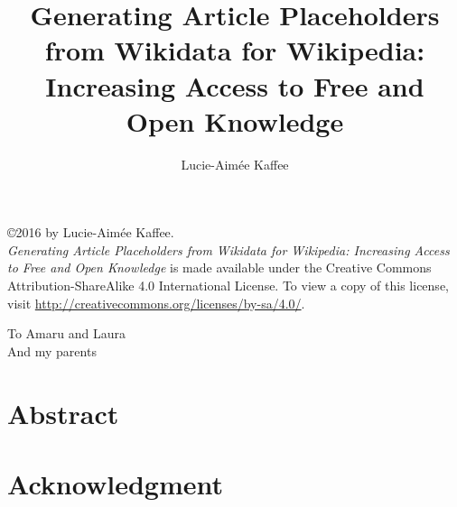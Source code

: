 \documentclass[11pt]{report} %
\title{Generating Article Placeholders from Wikidata for Wikipedia:\\Increasing Access to Free and Open Knowledge}
\author{Lucie-Aim\'{e}e Kaffee}
\date{}
\newenvironment{dedication}
  {\clearpage           %
   \thispagestyle{empty}%
   \vspace*{\stretch{1}}%
   \itshape             %
   \raggedleft          %
  }
  {\par %
   \vspace{\stretch{3}} %
   \clearpage           %
  }
\def\secondpage{\clearpage\null\vfill
\pagestyle{empty}
\begin{minipage}[b]{0.9\textwidth}
\footnotesize\raggedright
\setlength{\parskip}{0.5\baselineskip}
\copyright 2016 by Lucie-Aim\'{e}e Kaffee. \\
\textit{Generating Article Placeholders from Wikidata for Wikipedia: Increasing Access to Free and Open Knowledge} is made available under the Creative Commons Attribution-ShareAlike 4.0 International License. To view a copy of this license, visit \url{http://creativecommons.org/licenses/by-sa/4.0/}.
\end{minipage}
\vspace*{2\baselineskip}
\cleardoublepage
\rfoot{\thepage}}
\begin{document}
\maketitle 
\secondpage

\begin{dedication}
 To Amaru and Laura \\
 And my parents
\end{dedication}


\chapter*{Abstract}
\newpage

\tableofcontents




\newpage

\newpage



\chapter*{Acknowledgment}

\begin{appendix}

\end{appendix}

\renewcommand\bibname{Bibliography}


\end{document}
